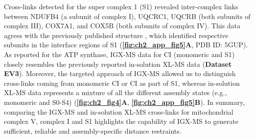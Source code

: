 Cross-links detected for the super complex 1 (S1) revealed inter-complex links between NDUFB4 (a subunit of complex I), UQCRC1, UQCRB (both subunits of complex III), COX7A1, and COX5B (both subunits of complex IV). This data agrees with the previously published structure \cite{Wu_2016}, which identified respective subunits in the interface regions of S1 (\textbf{\autoref{fig:ch2_app_fig5}A}, PDB ID: 5GUP). As reported for the ATP synthase, IGX-MS data for CI (monomeric and S1) closely resembles the previously reported in-solution XL-MS data \cite{Liu_2018} (\textbf{Dataset EV3}). Moreover, the targeted approach of IGX-MS allowed us to distinguish cross-links coming from monomeric CI or CI as part of S1, whereas in-solution XL-MS data represents a mixture of all the different assembly states (e.g., monomeric and S0-S4) (\textbf{\autoref{fig:ch2_fig4}A}, \textbf{\autoref{fig:ch2_app_fig5}B}).
In summary, comparing the IGX-MS and in-solution XL-MS cross-links for mitochondrial complex V, complex I and S1 highlights the capability of IGX-MS to generate sufficient, reliable and assembly-specific distance restraints.
%
